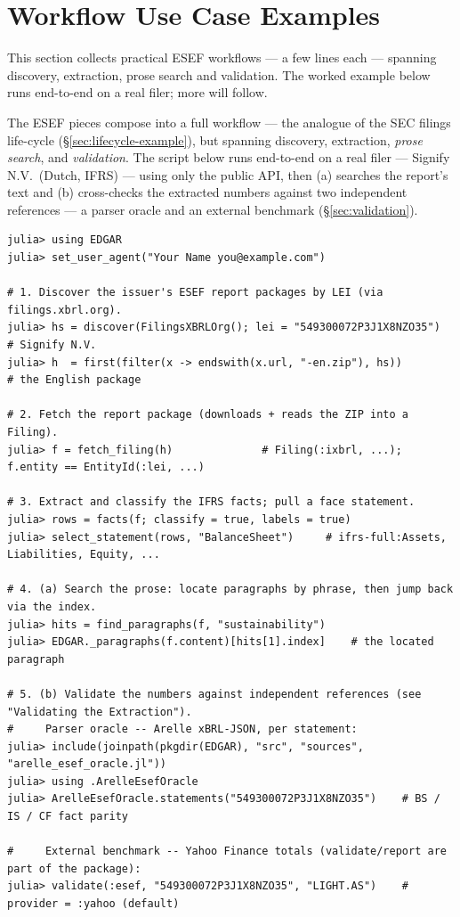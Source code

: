 \documentclass[11pt,a4paper]{report}
\begin{document}
\section{Workflow Use Case Examples}
\label{sec:esef-example}

This section collects practical ESEF workflows --- a few lines each --- spanning discovery, extraction,
prose search and validation. The worked example below runs end-to-end on a real filer; more will follow.

\noindent The ESEF pieces compose into a full workflow --- the analogue of the SEC filings life-cycle
(\S\ref{sec:lifecycle-example}), but spanning discovery, extraction, \emph{prose search}, and
\emph{validation}. The script below runs end-to-end on a real filer --- Signify N.V.\ (Dutch, IFRS) ---
using only the public API, then (a) searches the report's text and (b) cross-checks the extracted
numbers against two independent references --- a parser oracle and an external benchmark
(\S\ref{sec:validation}).

\begin{lstlisting}
julia> using EDGAR
julia> set_user_agent("Your Name you@example.com")

# 1. Discover the issuer's ESEF report packages by LEI (via filings.xbrl.org).
julia> hs = discover(FilingsXBRLOrg(); lei = "549300072P3J1X8NZO35")  # Signify N.V.
julia> h  = first(filter(x -> endswith(x.url, "-en.zip"), hs))         # the English package

# 2. Fetch the report package (downloads + reads the ZIP into a Filing).
julia> f = fetch_filing(h)              # Filing(:ixbrl, ...); f.entity == EntityId(:lei, ...)

# 3. Extract and classify the IFRS facts; pull a face statement.
julia> rows = facts(f; classify = true, labels = true)
julia> select_statement(rows, "BalanceSheet")     # ifrs-full:Assets, Liabilities, Equity, ...

# 4. (a) Search the prose: locate paragraphs by phrase, then jump back via the index.
julia> hits = find_paragraphs(f, "sustainability")
julia> EDGAR._paragraphs(f.content)[hits[1].index]    # the located paragraph

# 5. (b) Validate the numbers against independent references (see "Validating the Extraction").
#     Parser oracle -- Arelle xBRL-JSON, per statement:
julia> include(joinpath(pkgdir(EDGAR), "src", "sources", "arelle_esef_oracle.jl"))
julia> using .ArelleEsefOracle
julia> ArelleEsefOracle.statements("549300072P3J1X8NZO35")    # BS / IS / CF fact parity

#     External benchmark -- Yahoo Finance totals (validate/report are part of the package):
julia> validate(:esef, "549300072P3J1X8NZO35", "LIGHT.AS")    # provider = :yahoo (default)
\end{lstlisting}
\end{document}
